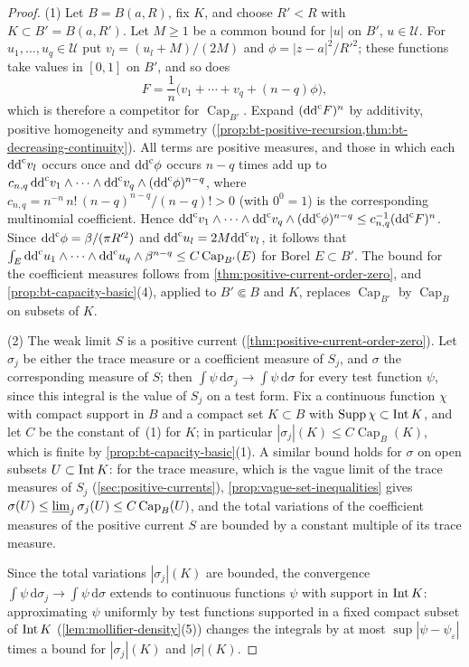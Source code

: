 \begin{proof}
(1) Let $B=B(a,R)$, fix $K$, and choose $R'<R$ with $K\subset B'=B(a,R')$. Let $M\ge1$ be a common bound for $|u|$ on $B'$, $u\in\mathcal U$. For $u_1,\ldots,u_q\in\mathcal U$ put $v_l=(u_l+M)/(2M)$ and $\phi=|z-a|^2/R'^2$; these functions take values in $[0,1]$ on $B'$, and so does
\[
 F=\frac1n\bigl(v_1+\cdots+v_q+(n-q)\phi\bigr),
\]
which is therefore a competitor for $\operatorname{Cap}_{B'}$. Expand $(\mathrm{dd}^{\mathrm{c}} F)^n$ by additivity, positive homogeneity and symmetry (\cref{prop:bt-positive-recursion,thm:bt-decreasing-continuity}). All terms are positive measures, and those in which each $\mathrm{dd}^{\mathrm{c}} v_l$ occurs once and $\mathrm{dd}^{\mathrm{c}}\phi$ occurs $n-q$ times add up to $c_{n,q}\,\mathrm{dd}^{\mathrm{c}} v_1\wedge\cdots\wedge\mathrm{dd}^{\mathrm{c}} v_q\wedge(\mathrm{dd}^{\mathrm{c}}\phi)^{n-q}$, where $c_{n,q}=n^{-n}\,n!\,(n-q)^{n-q}/(n-q)!>0$ (with $0^0=1$) is the corresponding multinomial coefficient. Hence $\mathrm{dd}^{\mathrm{c}} v_1\wedge\cdots\wedge\mathrm{dd}^{\mathrm{c}} v_q\wedge(\mathrm{dd}^{\mathrm{c}}\phi)^{n-q}\le c_{n,q}^{-1}(\mathrm{dd}^{\mathrm{c}} F)^n$. Since $\mathrm{dd}^{\mathrm{c}}\phi=\beta/(\pi R'^2)$ and $\mathrm{dd}^{\mathrm{c}} u_l=2M\mathrm{dd}^{\mathrm{c}} v_l$, it follows that $\int_E\mathrm{dd}^{\mathrm{c}} u_1\wedge\cdots\wedge\mathrm{dd}^{\mathrm{c}} u_q\wedge\beta^{n-q}\le C\operatorname{Cap}_{B'}(E)$ for Borel $E\subset B'$. The bound for the coefficient measures follows from \cref{thm:positive-current-order-zero}, and \cref{prop:bt-capacity-basic}(4), applied to $B'\Subset B$ and $K$, replaces $\operatorname{Cap}_{B'}$ by $\operatorname{Cap}_B$ on subsets of $K$.

(2) The weak limit $S$ is a positive current (\cref{thm:positive-current-order-zero}). Let $\sigma_j$ be either the trace measure or a coefficient measure of $S_j$, and $\sigma$ the corresponding measure of $S$; then $\int\psi\,\mathrm d\sigma_j\to\int\psi\,\mathrm d\sigma$ for every test function $\psi$, since this integral is the value of $S_j$ on a test form. Fix a continuous function $\chi$ with compact support in $B$ and a compact set $K\subset B$ with $\operatorname{Supp}\chi\subset\operatorname{Int} K$, and let $C$ be the constant of~(1) for $K$; in particular $|\sigma_j|(K)\le C\operatorname{Cap}_B(K)$, which is finite by \cref{prop:bt-capacity-basic}(1). A similar bound holds for $\sigma$ on open subsets $U\subset\operatorname{Int} K$: for the trace measure, which is the vague limit of the trace measures of $S_j$ (\cref{sec:positive-currents}), \cref{prop:vague-set-inequalities} gives $\sigma(U)\le\varliminf_j\sigma_j(U)\le C\operatorname{Cap}_B(U)$, and the total variations of the coefficient measures of the positive current $S$ are bounded by a constant multiple of its trace measure.

Since the total variations $|\sigma_j|(K)$ are bounded, the convergence $\int\psi\,\mathrm d\sigma_j\to\int\psi\,\mathrm d\sigma$ extends to continuous functions $\psi$ with support in $\operatorname{Int} K$: approximating $\psi$ uniformly by test functions supported in a fixed compact subset of $\operatorname{Int} K$ (\cref{lem:mollifier-density}(5)) changes the integrals by at most $\sup|\psi-\psi_\varepsilon|$ times a bound for $|\sigma_j|(K)$ and $|\sigma|(K)$.


\end{proof}
